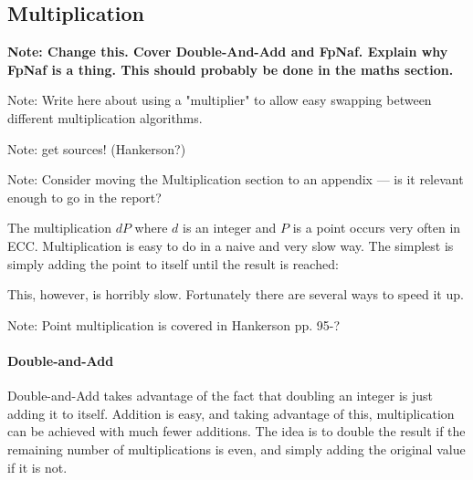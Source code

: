 \subsection{Multiplication}

\textbf{Note: Change this. Cover Double-And-Add and FpNaf. Explain why FpNaf is a thing. This should probably be done 
in the maths section.}

Note: Write here about using a "multiplier" to allow easy swapping between different multiplication algorithms.

Note: get sources! (Hankerson?)

Note: Consider moving the Multiplication section to an appendix --- is it relevant enough to go in the report?

The multiplication \(dP\) where \(d\) is an integer and \(P\) is a point occurs very often in ECC. Multiplication
is easy to do in a naive and very slow way. The simplest is simply adding the point to itself until the result is
reached:

This, however, is horribly slow. Fortunately there are several ways to speed it up.

Note: Point multiplication is covered in Hankerson pp. 95-?

\paragraph{Double-and-Add}

Double-and-Add takes advantage of the fact that doubling an integer is just adding it to itself. Addition is easy,
and taking advantage of this, multiplication can be achieved with much fewer additions. The idea is to double the
result if the remaining number of multiplications is even, and simply adding the original value if it is not.
